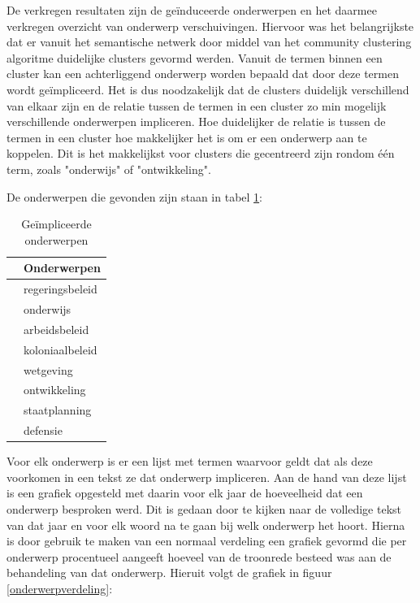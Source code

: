 De verkregen resultaten zijn de geïnduceerde onderwerpen en het daarmee verkregen overzicht van onderwerp verschuivingen. Hiervoor was het belangrijkste dat er vanuit het semantische netwerk door middel van het community clustering algoritme duidelijke clusters gevormd werden. Vanuit de termen binnen een cluster kan een achterliggend onderwerp worden bepaald dat door deze termen wordt geïmpliceerd. Het is dus noodzakelijk dat de clusters duidelijk verschillend van elkaar zijn en de relatie tussen de termen in een cluster zo min mogelijk verschillende onderwerpen impliceren. Hoe duidelijker de relatie is tussen de termen in een cluster hoe makkelijker het is om er een onderwerp aan te koppelen. Dit is het makkelijkst voor clusters die gecentreerd zijn rondom één term, zoals "onderwijs" of "ontwikkeling". 

De onderwerpen die gevonden zijn staan in tabel \ref{onderwerpen}:
\begin{table}[htb]
\centering
\begin{tabular}{ll}
\toprule
{} &                Onderwerpen \\
\midrule
 &  regeringsbeleid \\
 &        onderwijs \\
 &    arbeidsbeleid \\
 &  koloniaalbeleid \\
 &        wetgeving \\
 &     ontwikkeling \\
 &    staatplanning \\
 &         defensie \\
\bottomrule
\end{tabular}
\caption{Geïmpliceerde onderwerpen}
\label{onderwerpen}
\end{table}

Voor elk onderwerp is er een lijst met termen waarvoor geldt dat als deze voorkomen in een tekst ze dat onderwerp impliceren. Aan de hand van deze lijst is een grafiek opgesteld met daarin voor elk jaar de hoeveelheid dat een onderwerp besproken werd. Dit is gedaan door te kijken naar de volledige tekst van dat jaar en voor elk woord na te gaan bij welk onderwerp het hoort. Hierna is door gebruik te maken van een normaal verdeling een grafiek gevormd die per onderwerp procentueel aangeeft hoeveel van de troonrede besteed was aan de behandeling van dat onderwerp. Hieruit volgt de grafiek in figuur \ref{onderwerpverdeling}:

